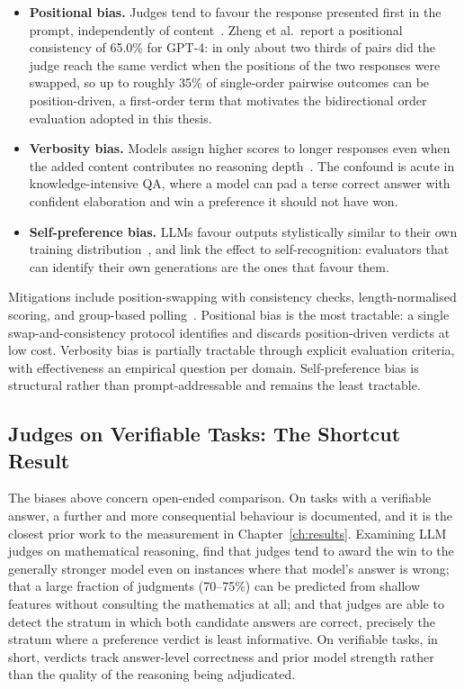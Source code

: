 \begin{itemize}
    \item \textbf{Positional bias.} Judges tend to favour the
    response presented first in the prompt, independently of
    content~\parencite{zheng2023judging}. Zheng et al.\ report a
    positional consistency of 65.0\% for GPT-4: in only about two
    thirds of pairs did the judge reach the same verdict when the
    positions of the two responses were swapped, so up to roughly
    35\% of single-order pairwise outcomes can be position-driven, a
    first-order term that motivates the bidirectional order
    evaluation adopted in this thesis.

    \item \textbf{Verbosity bias.} Models assign higher scores to
    longer responses even when the added content contributes no
    reasoning depth~\parencite{chen2024verbosity}. The confound is
    acute in knowledge-intensive QA, where a model can pad a terse
    correct answer with confident elaboration and win a preference it
    should not have won.

    \item \textbf{Self-preference bias.} LLMs favour outputs
    stylistically similar to their own training
    distribution~\parencite{wataoka2025selfpreference,
    panickssery2024llm}, and \textcite{panickssery2024llm} link the
    effect to self-recognition: evaluators that can identify their
    own generations are the ones that favour them.
\end{itemize}

Mitigations include position-swapping with consistency checks,
length-normalised scoring, and group-based
polling~\parencite{zheng2023judging}. Positional bias is the most
tractable: a single swap-and-consistency protocol identifies and
discards position-driven verdicts at low cost. Verbosity bias is
partially tractable through explicit evaluation criteria, with
effectiveness an empirical question per domain. Self-preference bias
is structural rather than prompt-addressable and remains the least
tractable.

\subsection*{Judges on Verifiable Tasks: The Shortcut Result}

The biases above concern open-ended comparison. On tasks with a
verifiable answer, a further and more consequential behaviour is
documented, and it is the closest prior work to the measurement in
Chapter~\ref{ch:results}. Examining LLM judges on mathematical
reasoning, \textcite{stephan2024calculation} find that judges tend to
award the win to the generally stronger model even on instances where
that model's answer is wrong; that a large fraction of judgments
(70--75\%) can be predicted from shallow features without consulting
the mathematics at all; and that judges are able to detect the
stratum in which both candidate answers are correct, precisely the
stratum where a preference verdict is least informative. On
verifiable tasks, in short, verdicts track answer-level correctness
and prior model strength rather than the quality of the reasoning
being adjudicated.

